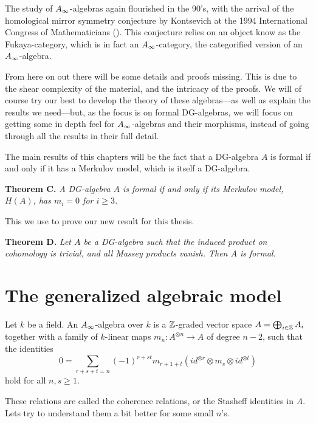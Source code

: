 The study of $\A$-algebras again flourished in the 90's, with the arrival of the homological mirror symmetry conjecture by Kontsevich at the 1994 International Congress of Mathematicians (\cite{kontsevich}). This conjecture relies on an object know as the Fukaya-category, which is in fact an $\A$-category, the categorified version of an $\A$-algebra.

From here on out there will be some details and proofs missing. This is due to the shear complexity of the material, and the intricacy of the proofs. We will of course try our best to develop the theory of these algebras---as well as explain the results we need---but, as the focus is on formal DG-algebras, we will focus on getting some in depth feel for $\A$-algebras and their morphisms, instead of going through all the results in their full detail.

The main results of this chapters will be the fact that a DG-algebra $A$ is formal if and only if it has a Merkulov model, which is itself a DG-algebra. 

\textbf{Theorem C.} \textit{A DG-algebra $A$ is formal if and only if its Merkulov model, $H(A)$, has $m_i=0$ for $i\geq 3$.}

This we use to prove our new result for this thesis. 

\textbf{Theorem D.} \textit{Let $A$ be a DG-algebra such that the induced product on cohomology is trivial, and all Massey products vanish. Then $A$ is formal.}

\section{The generalized algebraic model}

\begin{definition}[$\A$-algebra]
    Let $k$ be a field. An $\A$-algebra over $k$ is a $\mathbb{Z}$-graded vector space $A=\bigoplus_{i\in \mathbb{Z}}A_i$ together with a family of $k$-linear maps $m_n : A^{\otimes n}\rightarrow A$ of degree $n-2$, such that the identities 
    \begin{equation*}
        0=\sum_{r+s+t = n}(-1)^{r+st}m_{r+1+t}(id^{\otimes r}\otimes m_s \otimes id^{\otimes t})
    \end{equation*}
    hold for all $n, s\geq 1$. 
\end{definition}

These relations are called the coherence relations, or the Stasheff identities in $A$. Lets try to understand them a bit better for some small $n$'s. 

